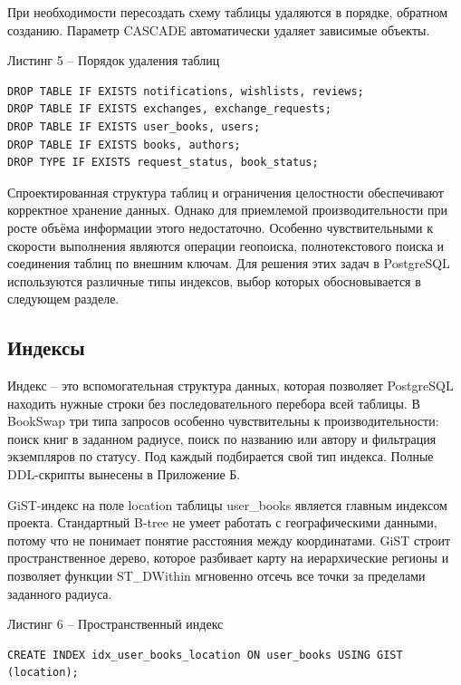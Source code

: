 \documentclass[14pt,a4paper]{extarticle}
\begin{document}
При необходимости пересоздать схему таблицы удаляются в порядке,
обратном созданию. Параметр CASCADE автоматически удаляет зависимые
объекты.

\newpage
\begin{center}
Листинг 5 -- Порядок удаления таблиц
\end{center}
\begin{lstlisting}
DROP TABLE IF EXISTS notifications, wishlists, reviews;
DROP TABLE IF EXISTS exchanges, exchange_requests;
DROP TABLE IF EXISTS user_books, users;
DROP TABLE IF EXISTS books, authors;
DROP TYPE IF EXISTS request_status, book_status;
\end{lstlisting}

Спроектированная структура таблиц и ограничения целостности обеспечивают
корректное хранение данных. Однако для приемлемой производительности при
росте объёма информации этого недостаточно. Особенно чувствительными к
скорости выполнения являются операции геопоиска, полнотекстового поиска
и соединения таблиц по внешним ключам. Для решения этих задач в
PostgreSQL используются различные типы индексов, выбор которых
обосновывается в следующем разделе.

\subsection{Индексы}

Индекс -- это вспомогательная структура данных, которая позволяет
PostgreSQL находить нужные строки без последовательного перебора всей
таблицы. В BookSwap три типа запросов особенно чувствительны к
производительности: поиск книг в заданном радиусе, поиск по названию или
автору и фильтрация экземпляров по статусу. Под каждый подбирается свой
тип индекса. Полные DDL-скрипты вынесены в Приложение Б.

GiST-индекс на поле location таблицы user\_books является главным
индексом проекта. Стандартный B-tree не умеет работать с географическими
данными, потому что не понимает понятие расстояния между координатами.
GiST строит пространственное дерево, которое разбивает карту на
иерархические регионы и позволяет функции ST\_DWithin мгновенно отсечь
все точки за пределами заданного радиуса.

\begin{center}
Листинг 6 -- Пространственный индекс
\end{center}
\begin{lstlisting}
CREATE INDEX idx_user_books_location ON user_books USING GIST
(location);
\end{lstlisting}
\end{document}
